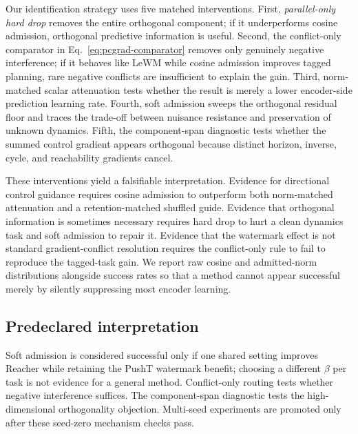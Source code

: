 Our identification strategy uses five matched interventions.  First,
\emph{parallel-only hard drop} removes the entire orthogonal component; if it
underperforms cosine admission, orthogonal predictive information is useful.
Second, the conflict-only comparator in
Eq.~\ref{eq:pcgrad-comparator} removes only genuinely negative interference; if
it behaves like LeWM while cosine admission improves tagged planning, rare
negative conflicts are insufficient to explain the gain.  Third,
norm-matched scalar attenuation tests whether the result is merely a lower
encoder-side prediction learning rate.  Fourth, soft admission sweeps the
orthogonal residual floor and traces the trade-off between nuisance resistance
and preservation of unknown dynamics.  Fifth, the component-span diagnostic
tests whether the summed control gradient appears orthogonal because distinct
horizon, inverse, cycle, and reachability gradients cancel.

These interventions yield a falsifiable interpretation.  Evidence for
directional control guidance requires cosine admission to outperform both
norm-matched attenuation and a retention-matched shuffled guide.  Evidence
that orthogonal information is sometimes necessary requires hard drop to hurt
a clean dynamics task and soft admission to repair it.  Evidence that the
watermark effect is not standard gradient-conflict resolution requires the
conflict-only rule to fail to reproduce the tagged-task gain.  We report raw
cosine and admitted-norm distributions alongside success rates so that a
method cannot appear successful merely by silently suppressing most encoder
learning.

\subsection{Predeclared interpretation}

Soft admission is considered successful only if one shared setting improves
Reacher while retaining the PushT watermark benefit; choosing a different
$\beta$ per task is not evidence for a general method.  Conflict-only routing
tests whether negative interference suffices.  The component-span diagnostic
tests the high-dimensional orthogonality objection.  Multi-seed experiments
are promoted only after these seed-zero mechanism checks pass.
